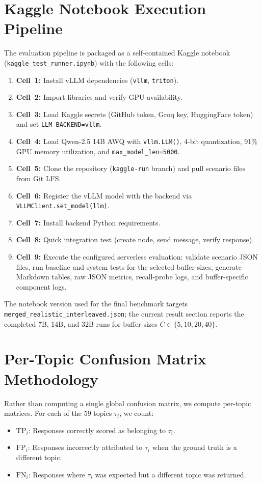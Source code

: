 \section{Kaggle Notebook Execution Pipeline}\label{secA2}

The evaluation pipeline is packaged as a self-contained Kaggle notebook (\texttt{kaggle\_test\_runner.ipynb}) with the following cells:

\begin{enumerate}
    \item \textbf{Cell~1:} Install vLLM dependencies (\texttt{vllm}, \texttt{triton}).
    \item \textbf{Cell~2:} Import libraries and verify GPU availability.
    \item \textbf{Cell~3:} Load Kaggle secrets (GitHub token, Groq key, HuggingFace token) and set \texttt{LLM\_BACKEND=vllm}.
    \item \textbf{Cell~4:} Load Qwen-2.5 14B AWQ with \texttt{vllm.LLM()}, 4-bit quantization, 91\% GPU memory utilization, and \texttt{max\_model\_len=5000}.
    \item \textbf{Cell~5:} Clone the repository (\texttt{kaggle-run} branch) and pull scenario files from Git LFS.
    \item \textbf{Cell~6:} Register the vLLM model with the backend via \texttt{VLLMClient.set\_model(llm)}.
    \item \textbf{Cell~7:} Install backend Python requirements.
    \item \textbf{Cell~8:} Quick integration test (create node, send message, verify response).
    \item \textbf{Cell~9:} Execute the configured serverless evaluation: validate scenario JSON files, run baseline and system tests for the selected buffer sizes, generate Markdown tables, raw JSON metrics, recall-probe logs, and buffer-specific component logs.
\end{enumerate}

The notebook version used for the final benchmark targets \texttt{merged\_realistic\_interleaved.json}; the current result section reports the completed 7B, 14B, and 32B runs for buffer sizes $C \in \{5,10,20,40\}$.

\section{Per-Topic Confusion Matrix Methodology}\label{secA3}

Rather than computing a single global confusion matrix, we compute per-topic matrices. For each of the 59 topics $\tau_i$, we count:
\begin{itemize}
    \item $\text{TP}_i$: Responses correctly scored as belonging to $\tau_i$.
    \item $\text{FP}_i$: Responses incorrectly attributed to $\tau_i$ when the ground truth is a different topic.
    \item $\text{FN}_i$: Responses where $\tau_i$ was expected but a different topic was returned.
\end{itemize}

